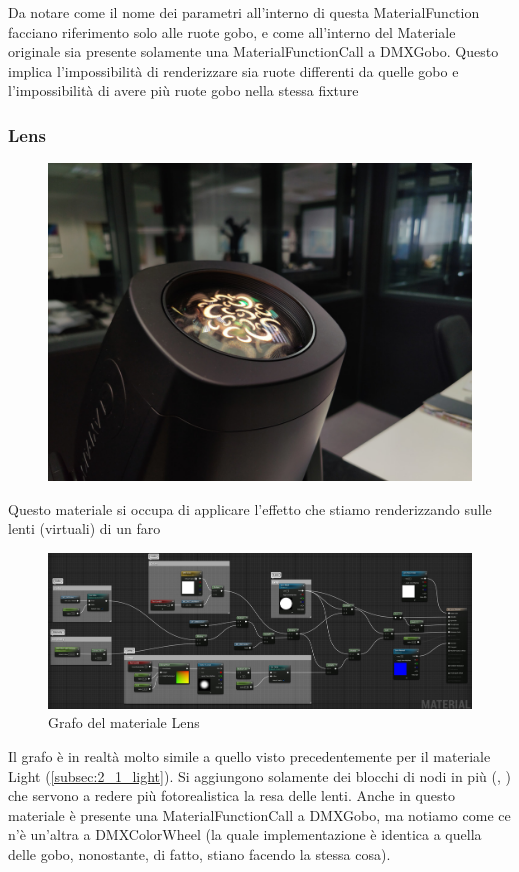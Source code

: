 \documentclass[main.tex]{subfiles}
\begin{document}
Da notare come il nome dei parametri all'interno di questa MaterialFunction facciano riferimento solo alle ruote gobo, e come all'interno del Materiale originale sia presente solamente una MaterialFunctionCall a DMXGobo. Questo implica l'impossibilità di renderizzare sia ruote differenti da quelle gobo e l'impossibilità di avere più ruote gobo nella stessa fixture

\subsubsection{Lens}\label{subsec:2_1_lens}
\begin{figure}[H]
    \centering
    \includegraphics[width=0.5\linewidth]{img/renderingPipeline/Lens.jpg}
    \label{fig:2_Lens}
\end{figure}
Questo materiale si occupa di applicare l'effetto che stiamo renderizzando sulle lenti (virtuali) di un faro
\begin{figure}[H]
    \centering
    \includegraphics[width=1\linewidth]{img/renderingPipeline/LensMaterialFull.jpg}
    \caption{Grafo del materiale Lens}
    \label{fig:2_lensGraphFull}
\end{figure}
Il grafo è in realtà molto simile a quello visto precedentemente per il materiale Light (\ref{subsec:2_1_light}). Si aggiungono solamente dei blocchi di nodi in più (, ) che servono a redere più fotorealistica la resa delle lenti. Anche in questo materiale è presente una MaterialFunctionCall a DMXGobo, ma notiamo come ce n'è un'altra a DMXColorWheel (la quale implementazione è identica a quella delle gobo, nonostante, di fatto, stiano facendo la stessa cosa).
\end{document}
